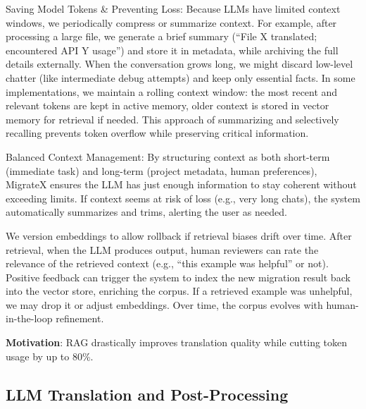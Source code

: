\documentclass[twocolumn]{article}
\begin{document}
    {Saving Model Tokens \& Preventing Loss}: Because LLMs have limited context windows, we periodically compress or summarize context. For example, after processing a large file, we generate a brief summary (``File X translated; encountered API Y usage'') and store it in metadata, while archiving the full details externally. When the conversation grows long, we might discard low-level chatter (like intermediate debug attempts) and keep only essential facts. In some implementations, we maintain a rolling context window: the most recent and relevant tokens are kept in active memory, older context is stored in vector memory for retrieval if needed. This approach of summarizing and selectively recalling prevents token overflow while preserving critical information.

    {Balanced Context Management}: By structuring context as both short-term (immediate task) and long-term (project metadata, human preferences), MigrateX ensures the LLM has just enough information to stay coherent without exceeding limits. If context seems at risk of loss (e.g., very long chats), the system automatically summarizes and trims, alerting the user as needed.

    We version embeddings to allow rollback if retrieval biases drift over time. After retrieval, when the LLM produces output, human reviewers can rate the relevance of the retrieved context (e.g., ``this example was helpful'' or not). Positive feedback can trigger the system to index the new migration result back into the vector store, enriching the corpus. If a retrieved example was unhelpful, we may drop it or adjust embeddings. Over time, the corpus evolves with human-in-the-loop refinement.

\textbf{Motivation}: RAG drastically improves translation quality while cutting token usage by up to 80\%.

\subsection{LLM Translation and Post-Processing}
    
\end{document}
